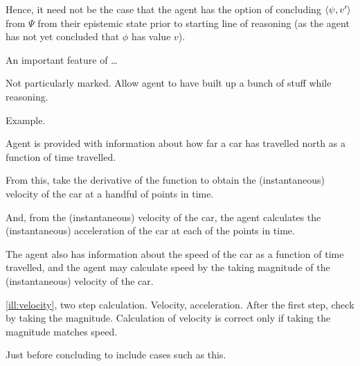 \begin{note}
  Hence, it need not be the case that the agent has the option of concluding \(\langle \psi, v' \rangle\) from \(\Psi\) from their epistemic state prior to starting line of reasoning (as the agent has not yet concluded that \(\phi\) has value \(v\)).
\end{note}

\begin{note}
  An important feature of \qzS{} \dots

  Not particularly marked.
  Allow agent to have built up a bunch of stuff while reasoning.

  Example.

  \begin{scenario}[Velocity]
    \label{ill:velocity}
    Agent is provided with information about how far a car has travelled north as a function of time travelled.

    From this, take the derivative of the function to obtain the (instantaneous) velocity of the car at a handful of points in time.

    And, from the (instantaneous) velocity of the car, the agent calculates the (instantaneous) acceleration of the car at each of the points in time.

    The agent also has information about the speed of the car as a function of time travelled, and the agent may calculate speed by the taking magnitude of the (instantaneous) velocity of the car.
  \end{scenario}

  \autoref{ill:velocity}, two step calculation.
  Velocity, acceleration.
  After the first step, check by taking the magnitude.
  Calculation of velocity is correct only if taking the magnitude matches speed.

  Just before concluding to include cases such as this.
\end{note}

